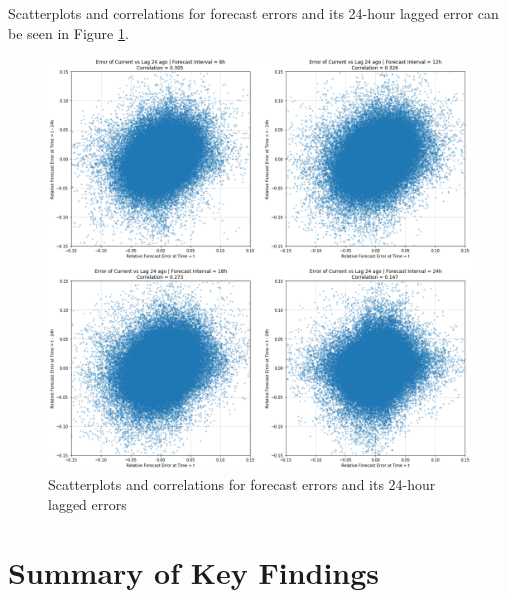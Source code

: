 \documentclass[mstat,12pt]{unswthesis}
\begin{document}
Scatterplots and correlations for forecast errors and its 24-hour lagged error can be seen in Figure \ref{fig:laggedError}.

\begin{figure}
\includegraphics[width=1\linewidth,height=0.6\textheight]{images/ForecastErrorCorrelations} \caption{Scatterplots and correlations for forecast errors and its 24-hour lagged errors}\label{fig:laggedError}
\end{figure}

\section{Summary of Key Findings}\label{summary-of-key-findings}
\end{document}
